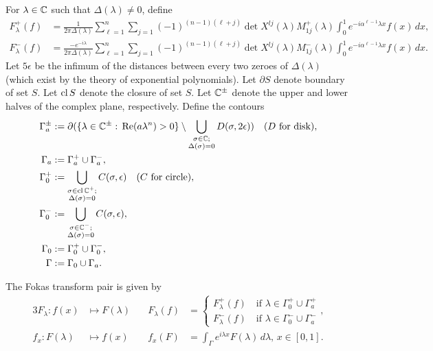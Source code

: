 \documentclass[11pt, oneside, a4paper]{article}
\begin{document}
For $\lambda\in\mathbb C$ such that $\Delta(\lambda)\neq 0$, define
\begin{align*}
    F^+_\lambda(f) &= \frac{1}{2\pi \Delta(\lambda)} \sum_{\ell=1}^n\sum_{j=1}(-1)^{(n-1)(\ell+j)}\det X^{lj}(\lambda)M^+_{1j}(\lambda)\int_0^1 e^{-i\alpha^{\ell-1}\lambda x}f(x)\,dx,\\
    F^-_\lambda(f) &= \frac{-e^{-i\lambda}}{2\pi \Delta(\lambda)} \sum_{\ell=1}^n\sum_{j=1}(-1)^{(n-1)(\ell+j)}\det X^{lj}(\lambda)M^-_{1j}(\lambda)\int_0^1 e^{-i\alpha^{\ell-1}\lambda x}f(x)\,dx.
\end{align*}
Let $5\epsilon$ be the infimum of the distances between every two zeroes of $\Delta(\lambda)$ (which exist by the theory of exponential polynomials\cite{Langer1930}). Let $\partial S$ denote boundary of set $S$. Let $\operatorname{cl}{S}$ denote the closure of set $S$. Let $\mathbb C^\pm$ denote the upper and lower halves of the complex plane, respectively. Define the contours
\begin{align*}
    \Gamma_a^{\pm} &:= \partial(\{\lambda\in\mathbb C^{\pm}:\, \mathrm{Re}(a\lambda^n)>0\}\setminus \bigcup_{\substack{\sigma\in\mathbb C;\\\Delta(\sigma)=0}} D(\sigma, 2\epsilon))\quad\mbox{($D$ for disk)},\\
    \Gamma_a &:= \Gamma_a^+\cup \Gamma_a^-,\\
    \Gamma_0^+ &:= \bigcup_{\substack{\sigma\in\operatorname{cl}\mathbb C^+;\\ \Delta(\sigma)=0}} C(\sigma, \epsilon)\quad\mbox{($C$ for circle)},\\
    \Gamma_0^- &:= \bigcup_{\substack{\sigma\in\mathbb C^-;\\ \Delta(\sigma)=0}} C(\sigma, \epsilon),\\
    \Gamma_0 &:= \Gamma_0^+\cup \Gamma_0^-,\\
    \Gamma &:= \Gamma_0\cup \Gamma_a.
\end{align*}

The Fokas transform pair is given by
\begin{alignat*}{3}
F_\lambda: f(x)&\mapsto F(\lambda)\quad &F_\lambda(f) &= \begin{cases}F^+_\lambda(f)\quad\mbox{if $\lambda\in \Gamma_0^+\cup \Gamma_a^+$}\\F^-_\lambda(f)\quad\mbox{if $\lambda\in \Gamma_0^-\cup \Gamma_a^-$}\end{cases},\\
f_x:F(\lambda)&\mapsto f(x)\quad &f_x(F) &= \int_\Gamma e^{i\lambda x} F(\lambda)\,d\lambda,\, x\in [0,1].
\end{alignat*}
\end{document}
